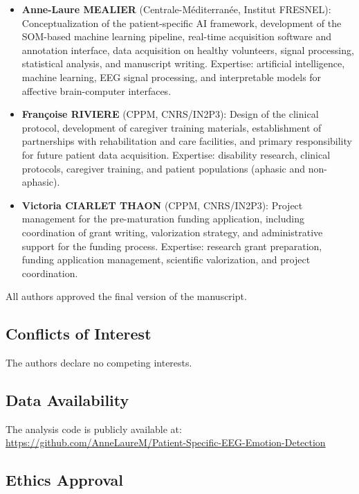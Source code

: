 \begin{itemize}
    \item \textbf{Anne-Laure MEALIER} (Centrale-Méditerranée, Institut FRESNEL): Conceptualization of the patient-specific AI framework, development of the SOM-based machine learning pipeline, real-time acquisition software and annotation interface, data acquisition on healthy volunteers, signal processing, statistical analysis, and manuscript writing. Expertise: artificial intelligence, machine learning, EEG signal processing, and interpretable models for affective brain-computer interfaces.
    
    \item \textbf{Françoise RIVIERE} (CPPM, CNRS/IN2P3): Design of the clinical protocol, development of caregiver training materials, establishment of partnerships with rehabilitation and care facilities, and primary responsibility for future patient data acquisition. Expertise: disability research, clinical protocols, caregiver training, and patient populations (aphasic and non-aphasic).
    
    \item \textbf{Victoria CIARLET THAON} (CPPM, CNRS/IN2P3): Project management for the pre-maturation funding application, including coordination of grant writing, valorization strategy, and administrative support for the funding process. Expertise: research grant preparation, funding application management, scientific valorization, and project coordination.
\end{itemize}

All authors approved the final version of the manuscript.

\subsection*{Conflicts of Interest}

The authors declare no competing interests.

\subsection*{Data Availability}

The analysis code is publicly available at: \url{https://github.com/AnneLaureM/Patient-Specific-EEG-Emotion-Detection}

\subsection*{Ethics Approval}

